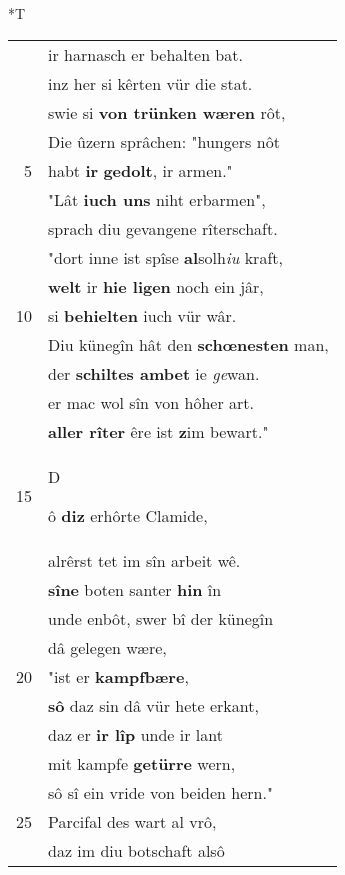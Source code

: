 \documentclass[8pt,a4paper,notitlepage]{article}
\begin{document}
\begin{table}[ht]
\begin{minipage}[t]{0.5\linewidth}
\end{minipage}
\hspace{0.5cm}
\begin{minipage}[t]{0.5\linewidth}
\small
\begin{center}*T
\end{center}
\begin{tabular}{rl}
 & ir harnasch er behalten bat.\\ 
 & inz her si kêrten vür die stat.\\ 
 & swie si \textbf{von trünken wæren} rôt,\\ 
 & Die ûzern sprâchen: "hungers nôt\\ 
5 & habt \textbf{ir} \textbf{gedolt}, ir armen."\\ 
 & "Lât \textbf{iuch uns} niht erbarmen",\\ 
 & sprach diu gevangene rîterschaft.\\ 
 & "dort inne ist spîse \textbf{al}solh\textit{iu} kraft,\\ 
 & \textbf{welt} ir \textbf{hie ligen} noch ein jâr,\\ 
10 & si \textbf{behielten} iuch vür wâr.\\ 
 & Diu künegîn hât den \textbf{schœnesten} man,\\ 
 & der \textbf{schiltes ambet} ie \textit{ge}wan.\\ 
 & er mac wol sîn von hôher art.\\ 
 & \textbf{aller rîter} êre ist \textbf{z}im bewart."\\ 
15 & \begin{large}D\end{large}ô \textbf{diz} erhôrte Clamide,\\ 
 & alrêrst tet im sîn arbeit wê.\\ 
 & \textbf{sîne} boten santer \textbf{hin} în\\ 
 & unde enbôt, swer bî der künegîn\\ 
 & dâ gelegen wære,\\ 
20 & "ist er \textbf{kampfbære},\\ 
 & \textbf{sô} daz sin dâ vür hete erkant,\\ 
 & daz er \textbf{ir lîp} unde ir lant\\ 
 & mit kampfe \textbf{getürre} wern,\\ 
 & sô sî ein vride von beiden hern."\\ 
25 & Parcifal des wart al vrô,\\ 
 & daz im diu botschaft alsô\\ 

\end{tabular}
\end{minipage}
\end{table}
\end{document}
